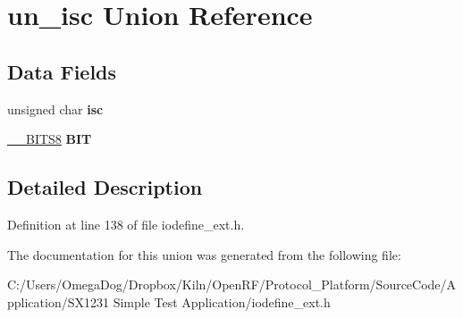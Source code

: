 \hypertarget{unionun__isc}{\section{un\-\_\-isc Union Reference}
\label{unionun__isc}
}
\subsection*{Data Fields}
\begin{DoxyCompactItemize}
\item 
\hypertarget{unionun__isc_aae47d88f34cb2d8e4e60f9c4a6ffbaae}{unsigned char {\bfseries isc}}\label{unionun__isc_aae47d88f34cb2d8e4e60f9c4a6ffbaae}

\item 
\hypertarget{unionun__isc_afe9c3739ff8714c1421ea528a6b4c787}{\hyperlink{struct_____b_i_t_s8}{\-\_\-\-\_\-\-B\-I\-T\-S8} {\bfseries B\-I\-T}}\label{unionun__isc_afe9c3739ff8714c1421ea528a6b4c787}

\end{DoxyCompactItemize}


\subsection{Detailed Description}


Definition at line 138 of file iodefine\-\_\-ext.\-h.



The documentation for this union was generated from the following file\-:\begin{DoxyCompactItemize}
\item 
C\-:/\-Users/\-Omega\-Dog/\-Dropbox/\-Kiln/\-Open\-R\-F/\-Protocol\-\_\-\-Platform/\-Source\-Code/\-Application/\-S\-X1231 Simple Test Application/iodefine\-\_\-ext.\-h\end{DoxyCompactItemize}
